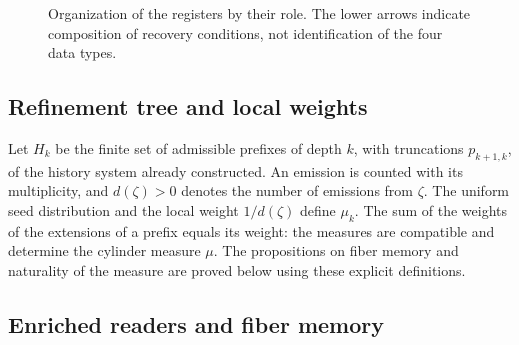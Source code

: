 \begin{figure}[htbp]
\centering
{}
\caption{Organization of the registers by their role.
The lower arrows indicate composition of recovery
conditions, not identification of the four data types.}
\label{lib07:fig-registros}
\end{figure}

\subsection{Refinement tree and local weights}
Let \(H_k\) be the finite set of admissible prefixes of depth
\(k\), with truncations \(p_{k+1,k}\), of the history system already
constructed. An emission is counted with its multiplicity, and
\(d(\zeta)>0\) denotes the number of emissions from \(\zeta\).
The uniform seed distribution and the local weight
\(1/d(\zeta)\) define \(\mu_k\). The sum of the weights of the
extensions of a prefix equals its weight: the measures are
compatible and determine the cylinder measure \(\mu\).
The propositions on fiber memory and
naturality of the measure are proved below using these explicit definitions.

\subsection{Enriched readers and fiber memory}
\label{sec:ch-memoria-fibra}

